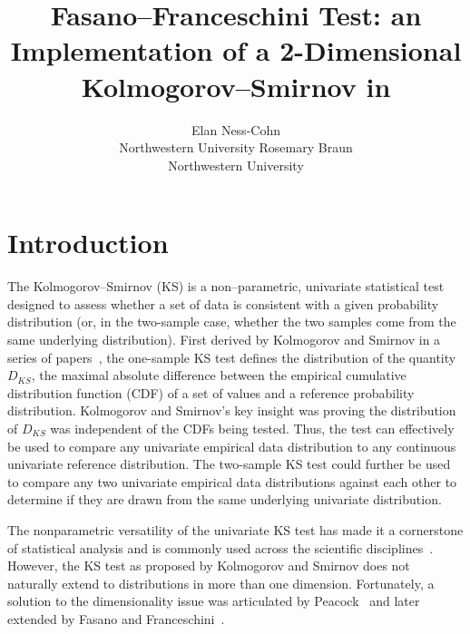 \documentclass[codesnippet]{jss}
\author{Elan Ness-Cohn\\Northwestern University
   \And Rosemary Braun\\Northwestern University}
\title{Fasano--Franceschini Test: an Implementation of a 2-Dimensional Kolmogorov--Smirnov in \proglang{R}}
\begin{document}


\section[Introduction]{Introduction} \label{sec:intro}

The Kolmogorov--Smirnov (KS) is a non--parametric, univariate
statistical test designed to assess whether a set of data is
consistent with a given probability distribution (or, in the two-sample 
case,  whether the two 
samples come from the same underlying distribution). First derived by
Kolmogorov and Smirnov in a series of
papers~\citep{Kolmogorov1933,Kolmogorov1933a,Smirnov1936,Smirnov1937,Smirnov1939,Smirnov1944,Smirnov1948},
the one-sample KS test defines the distribution of the quantity
$D_{KS}$, the maximal absolute difference between the empirical
cumulative distribution function (CDF) of a set of values and a
reference probability distribution. Kolmogorov and Smirnov's key
insight was proving the distribution of $D_{KS}$ was independent of
the CDFs being tested. Thus, the test can effectively be used to
compare any univariate empirical data distribution to any continuous
univariate reference distribution. The two-sample KS test could further
be used to compare any two univariate empirical data distributions
against each other to determine if they are drawn from the same
underlying univariate distribution.

The nonparametric versatility of the univariate KS test has made it a cornerstone of
statistical analysis and is commonly used across the scientific
disciplines~\citep{Atasoy2017,Chiang2018,Hahne2018,Hargreaves2020,Wong2020,Kaczanowska2021}.
However, the KS test as proposed by Kolmogorov
and Smirnov does not naturally extend to distributions in more
than one dimension. Fortunately, a solution to the dimensionality
issue was articulated by Peacock~\citep{Peacock1983} and later
extended by Fasano and Franceschini~\citep{Fasano1987}.
\end{document}
